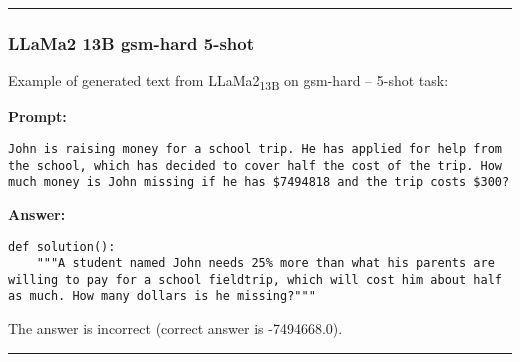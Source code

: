 \noindent\rule{\textwidth}{0.4pt}

\subsubsection*{LLaMa2 13B gsm-hard 5-shot}
\noindent Example of generated text from LLaMa2\textsubscript{13B} on gsm-hard -- 5-shot task:
\begin{displayquote}
	\textbf{Prompt:}
	\begin{Verbatim}[fontsize=\small,breaklines]
John is raising money for a school trip. He has applied for help from the school, which has decided to cover half the cost of the trip. How much money is John missing if he has $7494818 and the trip costs $300?
	\end{Verbatim}
	\textbf{Answer:}
	\begin{Verbatim}[fontsize=\small,breaklines]
def solution():
    """A student named John needs 25% more than what his parents are willing to pay for a school fieldtrip, which will cost him about half as much. How many dollars is he missing?"""
	\end{Verbatim}
\end{displayquote}
The answer is incorrect (correct answer is -7494668.0).

\noindent\rule{\textwidth}{0.4pt}

